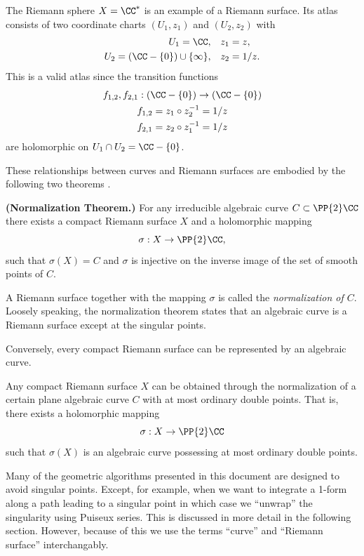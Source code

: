 The Riemann sphere $X = \CC^*$ is an example of a Riemann
surface. Its atlas consists of two coordinate charts $(U_1, z_1)$ and
$(U_2, z_2)$ with
\begin{align*}
    U_1 = \CC, & \quad z_1 = z, \\
    U_2 = \left( \CC - \{0\} \right) \cup \{ \infty \}, & \quad z_2 = 1/z.
\end{align*}
This is a valid atlas since the transition functions
\begin{gather*}
    f_{1,2}, f_{2,1} : \left(\CC - \{0\}\right)
    \to \left(\CC - \{0\}\right) \\
    f_{1,2} = z_1 \circ z_2^{-1} = 1/z \\
    f_{2,1} = z_2 \circ z_1^{-1} = 1/z
\end{gather*}
are holomorphic on $U_1 \cap U_2 = \CC - \{0\}$.

These relationships between curves and Riemann surfaces are embodied by
the following two theorems \cite{Griffiths89}.

\begin{theorem} \label{thm: normalization}
  {\bf (Normalization Theorem.)} For any irreducible algebraic curve $C
  \subset \PP{2}\CC$ there exists a compact Riemann surface $X$ and
  a holomorphic mapping
  \[
      \sigma : X \to \PP{2}\CC,
  \]
  such that $\sigma( X ) = C$ and $\sigma$ is injective on the
  inverse image of the set of smooth points of $C$.
\end{theorem}

A Riemann surface together with the mapping $\sigma$ is called the {\it
  normalization of $C$}. Loosely speaking, the normalization theorem
states that an algebraic curve is a Riemann surface except at the
singular points.

Conversely, every compact Riemann surface can be represented by an
algebraic curve.
\begin{theorem} \label{thm: repr-theorem}
  Any compact Riemann surface $X$ can be obtained through the
  normalization of a certain plane algebraic curve $C$ with at most
  ordinary double points. That is, there exists a holomorphic mapping
  \[
      \sigma : X \to \PP{2}\CC
  \]
  such that $\sigma(X)$ is an algebraic curve possessing at most
  ordinary double points.
\end{theorem}
Many of the geometric algorithms presented in this document are designed
to avoid singular points. Except, for example, when we want to integrate
a 1-form along a path leading to a singular point in which case we
``unwrap'' the singularity using Puiseux series. This is discussed in
more detail in the following section. However, because of this we use
the terms ``curve'' and ``Riemann surface'' interchangably.

